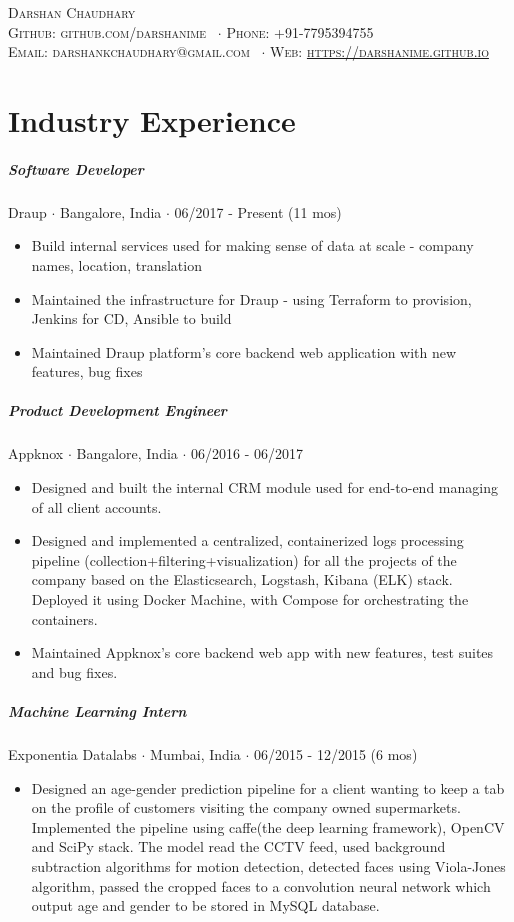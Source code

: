 \documentclass[10pt,letterpaper]{article}
\newcommand{\namestyle}{\Huge \scshape}
\newcommand{\addressstyle}{\color{addresscolor} \footnotesize \rmfamily \upshape}
\begin{document}
\begin{center}
    \namestyle Darshan Chaudhary \\[0.3em]
    \addressstyle Github: github.com/darshanime \ $\cdot$ Phone: +91-7795394755\\
    Email: darshankchaudhary@gmail.com \ $\cdot$ Web: \url{https://darshanime.github.io}
\end{center}

\small


\section*{Industry Experience}

\subparagraph{Software Developer}
Draup $\cdot$ Bangalore, India $\cdot$ 06/2017 - Present (11 mos)
\begin{itemize}
    \item Build internal services used for making sense of data at scale - company names, location, translation
    \item Maintained the infrastructure for Draup - using Terraform to provision, Jenkins for CD, Ansible to build
    \item Maintained Draup platform's core backend web application with new features, bug fixes
\end{itemize}

\subparagraph{Product Development Engineer}
Appknox $\cdot$ Bangalore, India $\cdot$ 06/2016 - 06/2017
\begin{itemize}
    \item Designed and built the internal CRM module used for end-to-end managing of all client accounts.
    \item Designed and implemented a centralized, containerized logs processing pipeline (collection+filtering+visualization) for all the projects of the company based on the Elasticsearch, Logstash, Kibana (ELK) stack. Deployed it using Docker Machine, with Compose for orchestrating the containers.
    \item Maintained Appknox's core backend web app with new features, test suites and bug fixes.
\end{itemize}

\subparagraph{Machine Learning Intern}
Exponentia Datalabs $\cdot$ Mumbai, India $\cdot$ 06/2015 - 12/2015 (6 mos)
\begin{itemize}
    \item Designed an age-gender prediction pipeline for a client wanting to keep a tab on the profile of customers visiting the company owned supermarkets. Implemented the pipeline using caffe(the deep learning framework), OpenCV and SciPy stack. The model read the CCTV feed, used background subtraction algorithms for motion detection, detected faces using Viola-Jones algorithm, passed the cropped faces to a convolution neural network which output age and gender to be stored in MySQL database.
\end{itemize}
\end{document}
